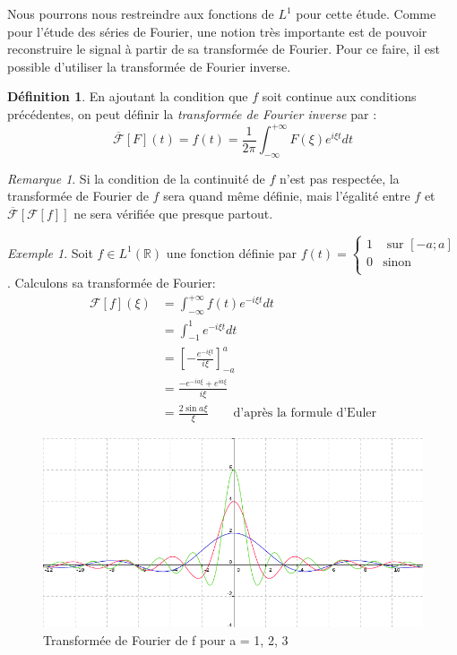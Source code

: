 \documentclass[]{article}
\theoremstyle{remark}
\newtheorem{myrem}{Remarque}
\newtheorem{myexmpl}{Exemple}
\theoremstyle{definition}
\newtheorem{mydef}{Définition}
\begin{document}
	Nous pourrons nous restreindre aux fonctions de $L^1$ pour cette étude. 
	Comme pour l'étude des séries de Fourier, une notion très importante est de pouvoir reconstruire le signal à partir de sa transformée de Fourier. Pour ce faire, il est possible d'utiliser la transformée de Fourier inverse. 

	\begin{mydef}
		En ajoutant la condition que $f$ soit continue aux conditions précédentes, on peut définir la \textit{transformée de Fourier inverse} par :
		$$ \overline{\mathcal{F}}[F](t) = f(t)=\frac{1}{{2\pi}} \int_{-\infty}^{+\infty}F(\xi)e^{i \xi t}dt $$ 
	\end{mydef}
	
	\begin{myrem}
		Si la condition de la continuité de $f$ n'est pas respectée, la transformée de Fourier de $f$ sera quand même définie, mais l'égalité entre $f$ et $\overline{\mathcal{F}}[\mathcal{F}[f]]$ ne sera vérifiée que presque partout. 
	\end{myrem}
			
	\begin{myexmpl}
		Soit $f \in L^1(\mathbb{R})$ une fonction définie par 	
		$ f(t) = \left\{
		\begin{array}{cc}
		1 & \text{ sur }[-a; a] \\
		0 & \text{sinon} \\
		\end{array}
		\right. $.
		Calculons sa transformée de Fourier: 
		\begin{align*}
			\mathcal{F}[f](\xi)& = \int_{- \infty}^{+\infty} f(t)e^{-i\xi t}dt \\
							   & = \int_{-1}^{1} e^{-i\xi t}dt \\
							   & =  \left[ -\frac{e^{-i\xi t}}{i \xi} \right]_{-a}^{a} \\
							   & =  \frac{-e^{-ia\xi} + e^{ia \xi}} {i \xi} \\
							   & = \frac {2 \sin{a\xi}}{\xi} \qquad \text{d'après la formule d'Euler}
		\end{align*}
		
			\begin{figure}[h]
				\centering
				\includegraphics[width=350pt]{TF123.png}
				\caption{Transformée de Fourier de f pour a = 1, 2, 3}
			\end{figure}
	\end{myexmpl}
	
\end{document}
